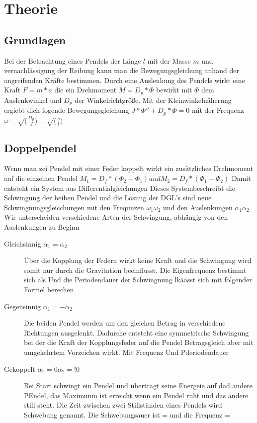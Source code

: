 \section{Theorie}
\label{sec:theorie}
\subsection{Grundlagen}
Bei der Betrachtung eines Pendels der Länge $l$ mit der Masse $m$ und vernachlässigung der Reibung kann man die Bewegungsgleichung anhand der angreifenden Kräfte bestimmen.
Durch eine Auslenkung des Pendels wirkt eine Kraft 
$F = m*a$ 
die ein Drehmoment 
$M = D_p*\Phi$ 
bewirkt mit $\Phi$ dem Auslenkwinkel und $D_p$ der Winkelrichtgröße.
Mit der Kleinwinkelnäherung ergiebt dich fogende Bewegungsgleichung 
$J*\Phi'' + D_p * \Phi = 0$ 
mit der Frequenz 
$\omega = \sqrt(\frac{D_p}{J})=\sqrt(\frac{g}{l})$
\subsection{Doppelpendel}
Wenn man zei Pendel mit einer Feder koppelt wirkt ein zusätzliches Drehmoment auf die einzelnen Pendel 
$M_1 = D_f*(\Phi_2-\Phi_1) und M_2=D_f*(\Phi_1-\Phi_2)$
Damit entsteht ein System aus Differentialgleichungen
Dieses Systembeschreibt die Schwingung der beiben Pendel und die Lösung der DGL's sind neue Schwingnungsgleicchungen mit den Frequnzen $\omega_1 \omega_2$ und den  Auslenkungen $\alpha_1 \alpha_2$
Wir unterscheiden verschiedene Arten der Schwingung, abhängig von den Auslenkungen zu Beginn
\begin{description}
    \item[Gleichsinnig $\alpha_1 = \alpha_2$]
        Über die Kopplung der Federn wirkt keine Kraft und die Schwingung wird somit nur durch die Gravitation beeinflusst.
        Die Eigenfrequenz bestimmt sich als
        Und die Periodendauer der Schwingnung lkäässt sich mit folgender Formel berechen 
    \item[Gegensinnig $\alpha_1 = -\alpha_2$]
        Die beiden Pendel werden um den gleichen Betrag in verschiedene Richtungen ausgelenkt.
        Dadurche entsteht eine symmetrische Schwingung bei der die Kraft der Kopplungsfeder auf die Pendel Betragsgleich aber mit umgekehrtem Vorzeichen wirkt.
        Mit Frequenz
        Und Pderiodendauer
    \item[Gekoppelt $\alpha_1 =0 \alpha_2 =! 0$]  
        Bei Start schwingt ein Pendel und übertragt seine Energeie auf dad andere PEndel, das Maximunm ist erreicht wenn ein Pendel ruht und das andere still steht.
        Die Zeit zwischen zwei Stillständen eines Pendels wird Schwebung genannt.
        Die Schwebungsauer ist = und die Frequenz =  
\end{description}
